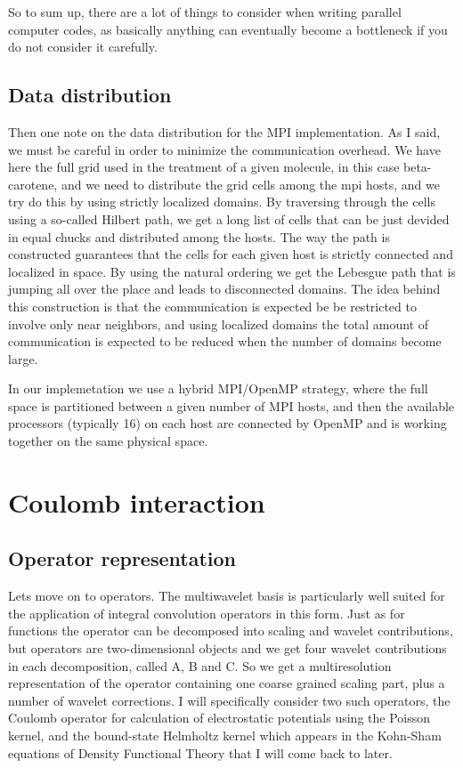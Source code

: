 \documentclass [a4paper]{report}
\begin{document}
So to sum up, there are a lot of things to consider when writing parallel computer codes, as
basically anything can eventually become a bottleneck if you do not consider it carefully.

\subsection*{Data distribution}
Then one note on the data distribution for the MPI implementation. As I said, we must be 
careful in order to minimize the communication overhead. We have here the full grid used
in the treatment of a given molecule, in this case beta-carotene, and we need to distribute
the grid cells among the mpi hosts, and we try do this by using strictly localized domains. 
By traversing through the cells using a so-called Hilbert path, we get a long list of cells
that can be just devided in equal chucks and distributed among the hosts. The way the path 
is constructed guarantees that the cells for each given host is strictly connected and 
localized in space. By using the natural ordering we get the Lebesgue path that is jumping 
all over the place and leads to disconnected domains. The idea behind this construction is
that the communication is expected be be restricted to involve only near neighbors, and
using localized domains the total amount of communication is expected to be reduced when
the number of domains become large.

In our implemetation we use a hybrid MPI/OpenMP strategy, where the full space is partitioned
between a given number of MPI hosts, and then the available processors (typically 16) on each 
host are connected by OpenMP and is working together on the same physical space.

\section*{Coulomb interaction}

\subsection*{Operator representation}
Lets move on to operators. The multiwavelet basis is particularly well suited for the application
of integral convolution operators in this form. Just as for functions the operator can be 
decomposed into scaling and wavelet contributions, but operators are two-dimensional objects
and we get four wavelet contributions in each decomposition, called A, B and C. So we get a
multiresolution representation of the operator containing one coarse grained scaling part,
plus a number of wavelet corrections. I will specifically consider two such operators,
the Coulomb operator for calculation of electrostatic potentials using the Poisson kernel,
and the bound-state Helmholtz kernel which appears in the Kohn-Sham equations of Density
Functional Theory that I will come back to later. 
\end{document}
